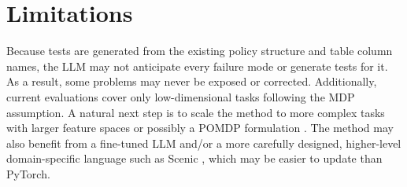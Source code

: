\section{Limitations}
\label{sec:discussion}
\label{sec:limitations}

Because tests are generated from the existing policy structure and table column names, the LLM may not anticipate every failure mode or generate tests for it. As a result, some problems may never be exposed or corrected.
Additionally, current evaluations cover only low-dimensional tasks following the MDP assumption. A natural next step is to scale the method to more complex tasks with larger feature spaces or possibly a POMDP formulation \cite{kaelbling1998planning}.
The method may also benefit from a fine-tuned LLM and/or a more carefully designed, higher-level domain-specific language such as Scenic \cite{fremont2019scenic}, which may be easier to update than PyTorch.



% 
% 

